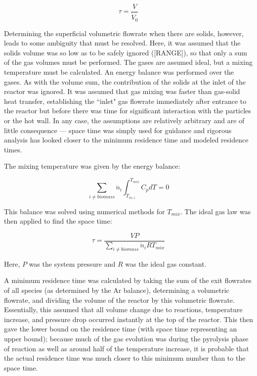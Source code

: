 \documentclass[11pt,twocolumn]{article}
\begin{document}
\begin{equation}
	\tau = \frac{V}{\dot{V}_{0}}
\end{equation}

Determining the superficial volumetric flowrate when there are solids, however, leads to some ambiguity that must be resolved.  Here, it was assumed that the solids volume was so low as to be safely ignored ([RANGE]), so that only a sum of the gas volumes must be performed.  The gases are assumed ideal, but a mixing temperature must be calculated.  An energy balance was performed over the gases.  As with the volume sum, the contribution of the solids at the inlet of the reactor was ignored.  It was assumed that gas mixing was faster than gas-solid heat transfer, establishing the ``inlet" gas flowrate immediately after entrance to the reactor but before there was time for significant interaction with the particles or the hot wall.  In any case, the assumptions are relatively arbitrary and are of little consequence --- space time was simply used for guidance and rigorous analysis has looked closer to the minimum residence time and modeled residence times.

The mixing temperature was given by the energy balance:

\begin{equation}
	\sum_{i \ne biomass}\dot{n}_{i}\int_{T_{in,i}}^{T_{mix}}C_{p}dT = 0
\end{equation}

This balance was solved using numerical methods for $T_{mix}$. The ideal gas law was then applied to find the space time:

\begin{equation}
	\tau = \frac{VP}{\sum_{i \ne biomass}\dot{n}_{i}RT_{mix}}
\end{equation}

Here, $P$ was the system pressure and $R$ was the ideal gas constant.

A minimum residence time was calculated by taking the sum of the exit flowrates of all species (as determined by the Ar balance), determining a volumetric flowrate, and dividing the volume of the reactor by this volumetric flowrate.  Essentially, this assumed that all volume change due to reactions, temperature increase, and pressure drop occurred instantly at the top of the reactor.  This then gave the lower bound on the residence time (with space time representing an upper bound); because much of the gas evolution was during the pyrolysis phase of reaction as well as around half of the temperature increase, it is probable that the actual residence time was much closer to this minimum number than to the space time.  
\end{document}

